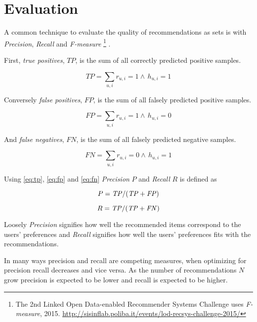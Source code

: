 
\newpage
\section{Evaluation}\label{sec:theory:eval}


A common technique to evaluate the quality of recommendations as sets is with \textit{Precision}, \textit{Recall} and \textit{F-measure}
\footnote{The 2nd Linked Open Data-enabled Recommender Systems Challenge uses \textit{F-measure}, 2015. \url{http://sisinflab.poliba.it/events/lod-recsys-challenge-2015/}}
. \citep{bobadilla2013recommender}

First, \textit{true positives}, $TP$, is the sum of all correctly predicted positive samples.

\begin{equation} \label{eq:tp}
    TP = \sum_{u, i} r_{u, i} = 1 \land \, h_{u, i} = 1
\end{equation}

Conversely \textit{false positives}, $FP$, is the sum of all falsely predicted positive samples.

\begin{equation} \label{eq:fp}
    FP = \sum_{u, i} r_{u, i} = 1 \land \, h_{u, i} = 0
\end{equation}

And \textit{false negatives}, $FN$, is the sum of all falsely predicted negative samples.

\begin{equation} \label{eq:fn}
    FN = \sum_{u, i} r_{u, i} = 0 \land \, h_{u, i} = 1
\end{equation}

Using \eqref{eq:tp}, \eqref{eq:fp} and \eqref{eq:fn} \textit{Precision} $P$ and \textit{Recall} $R$ is defined as

\begin{equation} \label{eq:precision}
    P = \mathit{TP} / (\mathit{TP} + \mathit{FP})
\end{equation}

\begin{equation} \label{eq:recall}
    R = \mathit{TP} / (\mathit{TP} + \mathit{FN})
\end{equation}

Loosely \textit{Precision} signifies how well the recommended items correspond to the users' preferences and \textit{Recall} signifies how well the users' preferences fits with the recommendations.

In many ways precision and recall are competing measures, when optimizing for precision recall decreases and vice versa.  As the number of recommendations $N$ grow precision is expected to be lower and recall is expected to be higher. \citep{hu2008collaborative}


